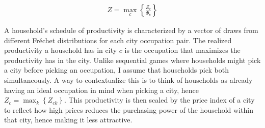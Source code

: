 \documentclass[10pt]{article}
\begin{document}
\begin{align*}
    Z = \max_c \left\{ \frac{Z_c}{\Phi_c} \right\}
\end{align*}

A household's schedule of productivity is characterized by a vector of draws from different Fr\'{e}chet distributions for each city occupation pair. The realized productivity a household has in city $c$ is the occupation that maximizes the productivity has in the city. Unlike sequential games where households might pick a city before picking an occupation, I assume that households pick both simultaneously. A way to contextualize this is to think of households as already having an ideal occupation in mind when picking a city, hence $Z_c = \max_k \left\{ Z_{ck} \right\}$. This productivity is then scaled by the price index of a city to reflect how high prices reduces the purchasing power of the household within that city, hence making it less attractive.





\end{document}
